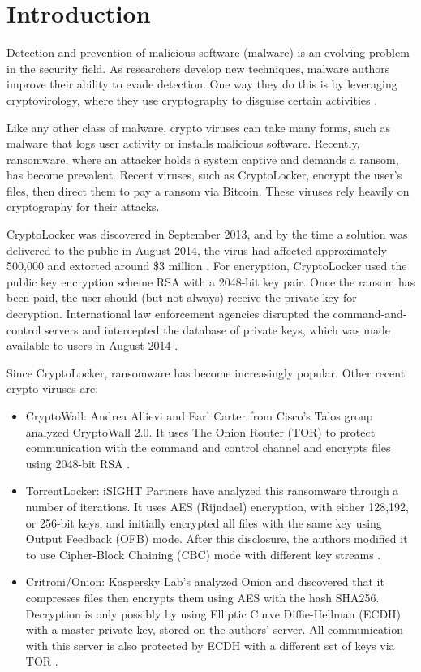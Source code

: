 \chapter{Introduction}


Detection and prevention of malicious software (malware) is an evolving problem in the security field.  As researchers develop new techniques, malware authors improve their ability to evade detection.  One way they do this is by leveraging cryptovirology, where they use cryptography to disguise certain activities \cite{cryptovirology}.

Like any other class of malware, crypto viruses can take many forms, such as malware that logs user activity or installs malicious software.  Recently, ransomware, where an attacker holds a system captive and demands a ransom, has become prevalent.  Recent viruses, such as CryptoLocker, encrypt the user's files, then direct them to pay a ransom via Bitcoin.  These viruses rely heavily on cryptography for their attacks.

CryptoLocker was discovered in September 2013, and by the time a solution was delivered to the public in August 2014, the virus had affected approximately 500,000 and extorted around \$3 million \cite{BBCcryptolocker}.  For encryption, CryptoLocker used the public key encryption scheme RSA with a 2048-bit key pair.  Once the ransom has been paid, the user should (but not always) receive the private key for decryption.  International law enforcement agencies disrupted the command-and-control servers and intercepted the database of private keys, which was made available to users in August 2014 \cite{ARScryptolocker}.  

Since CryptoLocker, ransomware has become increasingly popular.  Other recent crypto viruses are:
\begin{itemize}
	\item CryptoWall: Andrea Allievi and Earl Carter from Cisco's Talos group analyzed CryptoWall 2.0.  It uses The Onion Router (TOR) to protect communication with the command and control channel and encrypts files using 2048-bit RSA \cite{cryptowall}.
	\item TorrentLocker: iSIGHT Partners have analyzed this ransomware through a number of iterations.  It uses AES (Rijndael) encryption, with either 128,192, or 256-bit keys, and initially encrypted all files with the same key using Output Feedback (OFB) mode. After this disclosure, the authors modified it to use Cipher-Block Chaining (CBC) mode with different key streams \cite{torrentlocker}. 
	\item Critroni/Onion: Kaspersky Lab's analyzed Onion and discovered that it compresses files then encrypts them using AES with the hash SHA256.  Decryption is only possibly by using Elliptic Curve Diffie-Hellman (ECDH) with a master-private key, stored on the authors' server.  All communication with this server is also protected by ECDH with a different set of keys via TOR \cite{onion}. 
\end{itemize}

